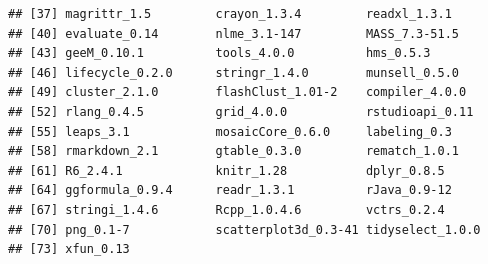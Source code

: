 \documentclass[
]{krantz}
\begin{document}
\begin{verbatim}
## [37] magrittr_1.5         crayon_1.3.4         readxl_1.3.1        
## [40] evaluate_0.14        nlme_3.1-147         MASS_7.3-51.5       
## [43] geeM_0.10.1          tools_4.0.0          hms_0.5.3           
## [46] lifecycle_0.2.0      stringr_1.4.0        munsell_0.5.0       
## [49] cluster_2.1.0        flashClust_1.01-2    compiler_4.0.0      
## [52] rlang_0.4.5          grid_4.0.0           rstudioapi_0.11     
## [55] leaps_3.1            mosaicCore_0.6.0     labeling_0.3        
## [58] rmarkdown_2.1        gtable_0.3.0         rematch_1.0.1       
## [61] R6_2.4.1             knitr_1.28           dplyr_0.8.5         
## [64] ggformula_0.9.4      readr_1.3.1          rJava_0.9-12        
## [67] stringi_1.4.6        Rcpp_1.0.4.6         vctrs_0.2.4         
## [70] png_0.1-7            scatterplot3d_0.3-41 tidyselect_1.0.0    
## [73] xfun_0.13
\end{verbatim}

\cleardoublepage

  

\backmatter
\printindex
\end{document}
